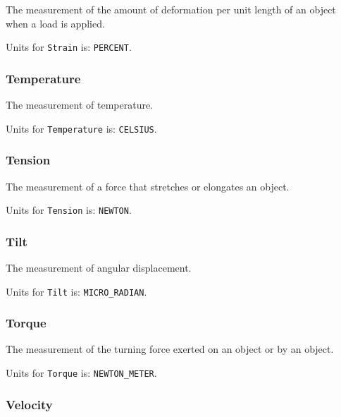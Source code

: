 The measurement of the amount of deformation per unit length of an object when a load is applied.


Units for \texttt{Strain} is: \texttt{PERCENT}.

\FloatBarrier

\subsubsection{Temperature}
\label{sec:Temperature}



The measurement of temperature.


Units for \texttt{Temperature} is: \texttt{CELSIUS}.

\FloatBarrier

\subsubsection{Tension}
\label{sec:Tension}



The measurement of a force that stretches or elongates an object.


Units for \texttt{Tension} is: \texttt{NEWTON}.

\FloatBarrier

\subsubsection{Tilt}
\label{sec:Tilt}



The measurement of angular displacement.


Units for \texttt{Tilt} is: \texttt{MICRO_RADIAN}.

\FloatBarrier

\subsubsection{Torque}
\label{sec:Torque}



The measurement of the turning force exerted on an object or by an object.


Units for \texttt{Torque} is: \texttt{NEWTON_METER}.

\FloatBarrier

\subsubsection{Velocity}
\label{sec:Velocity}



